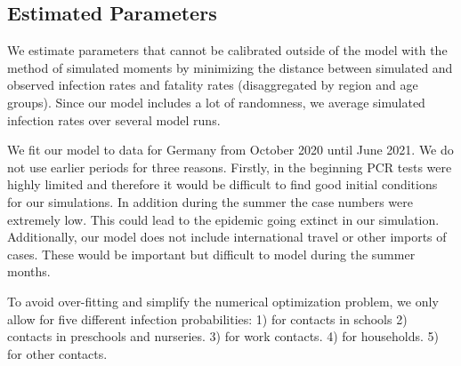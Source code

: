 \subsection{Estimated Parameters}
\label{subsec:estimated_params}


\FloatBarrier

We estimate parameters that cannot be calibrated outside of the model with the
method of simulated moments \citep{McFadden1989} by minimizing the distance between
simulated and observed infection rates and fatality rates (disaggregated by region
and age groups). Since our model includes a lot of randomness, we
average simulated infection rates over several model runs.

We fit our model to data for Germany from October 2020 until June 2021. We do not use
earlier periods for three reasons. Firstly, in the beginning PCR tests were highly
limited and therefore it would be difficult to find good initial conditions for our
simulations. In addition during the summer the case numbers were extremely low. This
could lead to the epidemic going extinct in our simulation. Additionally, our model does
not include international travel or other imports of cases. These would be important but
difficult to model during the summer months.


To avoid over-fitting and simplify the numerical optimization problem, we only allow for
five different infection probabilities: 1) for contacts in schools 2) contacts in
preschools and nurseries. 3) for work contacts. 4) for households. 5) for other
contacts.

